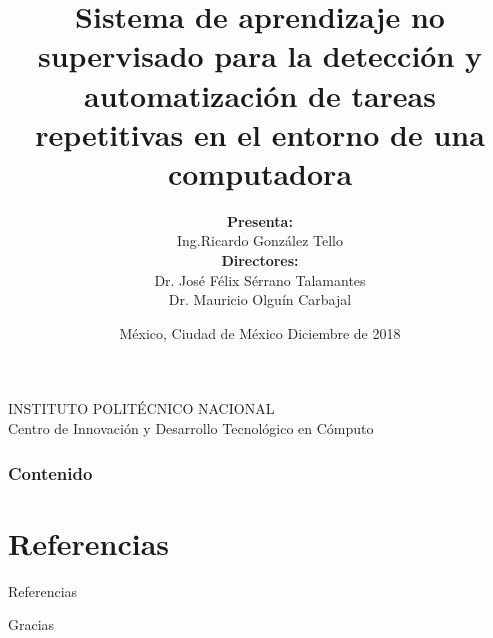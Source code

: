 \documentclass[11pt]{beamer}
\title[Tesis]{\small\textbf{Sistema de aprendizaje no supervisado para la 
 detecci\'on y automatizaci\'on de tareas repetitivas en el entorno de una 
  computadora}}
\author[Gonz\'alez Tello]{
\textbf{\footnotesize Presenta:}\\
[0.1cm]{\footnotesize Ing.Ricardo Gonz\'alez Tello \\
[0.2cm] \footnotesize\textbf{Directores:} \\
[0.1cm] \footnotesize Dr. Jos\'e F\'elix S\'errano Talamantes \\
[0.1cm] \footnotesize Dr. Mauricio Olgu\'in Carbajal}
}
\date{\footnotesize México, Ciudad de México \hspace{2.5cm}
      \footnotesize Diciembre de 2018}
\begin{document}
\renewcommand{\tablename}{Tabla}
\renewcommand{\figurename}{Figura}

\begin{frame}
\begin{center}

    INSTITUTO POLIT\'{E}CNICO NACIONAL\\
    Centro de Innovaci\'on y Desarrollo
    Tecnol\'ogico en C\'omputo

\end{center}
\titlepage
\end{frame}

\begin{frame}
\frametitle{Contenido}
\footnotesize
\tableofcontents[hideothersubsections, subsubsectionstyle=hide]
\end{frame}










\section{Referencias}
\begin{frame}
\Huge
\centering
Referencias
\end{frame}

\tiny





\begin{frame}
\centering
\begin{Huge}
Gracias
\end{Huge}
\end{frame}
\end{document}
